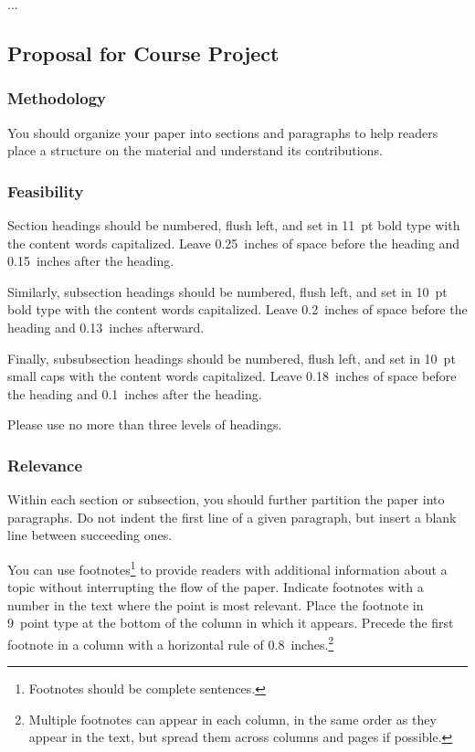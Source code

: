 \documentclass{article}
\theoremstyle{plain}
\theoremstyle{definition}
\theoremstyle{remark}
\begin{document}
...


\subsection{Proposal for Course Project}

\subsubsection{Methodology}

You should organize your paper into sections and paragraphs to help
readers place a structure on the material and understand its
contributions.

\subsubsection{Feasibility}

Section headings should be numbered, flush left, and set in 11~pt bold
type with the content words capitalized. Leave 0.25~inches of space
before the heading and 0.15~inches after the heading.

Similarly, subsection headings should be numbered, flush left, and set
in 10~pt bold type with the content words capitalized. Leave
0.2~inches of space before the heading and 0.13~inches afterward.

Finally, subsubsection headings should be numbered, flush left, and
set in 10~pt small caps with the content words capitalized. Leave
0.18~inches of space before the heading and 0.1~inches after the
heading.

Please use no more than three levels of headings.

\subsubsection{Relevance}

Within each section or subsection, you should further partition the
paper into paragraphs. Do not indent the first line of a given
paragraph, but insert a blank line between succeeding ones.

You can use footnotes\footnote{Footnotes
should be complete sentences.} to provide readers with additional
information about a topic without interrupting the flow of the paper.
Indicate footnotes with a number in the text where the point is most
relevant. Place the footnote in 9~point type at the bottom of the
column in which it appears. Precede the first footnote in a column
with a horizontal rule of 0.8~inches.\footnote{Multiple footnotes can
appear in each column, in the same order as they appear in the text,
but spread them across columns and pages if possible.}
\end{document}
